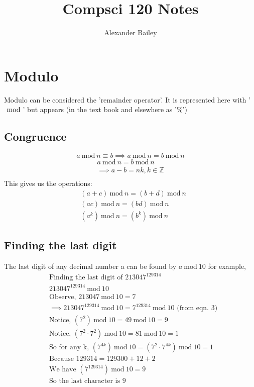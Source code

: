 \documentclass[12pt] {article}
\newcommand{\Mod}[1]{\ \mathrm{mod}\ #1}
\begin{document}
\title{Compsci 120 Notes}
\author{Alexander Bailey}
\maketitle

\section*{Modulo}
Modulo can be considered the 'remainder operator'. It is represented here with '$\Mod$'
but appears (in the text book and elsewhere as '$\%$')
\subsection*{Congruence}
\begin{equation*}
  a \Mod n \equiv b 
  \implies a \Mod n = b \Mod n
\end{equation*}
\begin{align*}
  a \Mod n = b \Mod n \\
  \implies a-b = nk, k \in \mathbb{Z} \\
\end{align*}
This gives us the operations:
\begin{align}
  &(a+c) \Mod n = (b+d) \Mod n \\
  &(ac) \Mod n = (bd) \Mod n \\
  &(a^k) \Mod n = (b^k) \Mod n 
\end{align}
\subsection*{Finding the last digit}
The last digit of any decimal number a can be found by $a \Mod 10$ for example,
\begin{align*}
  &\text{Finding the last digit of } 213047^{129314} \\
  &213047^{129314} \Mod 10 \\
  &\text{Observe, } 213047 \Mod 10 = 7 \\
  &\implies  213047^{129314} \Mod 10 = 7^{129314} \Mod 10 \text{ (from eqn. 3)} \\
  &\text{Notice, } (7^2) \Mod 10 = 49 \Mod 10 = 9 \\
  &\text{Notice, } (7^2 \cdot 7^2) \Mod 10 = 81 \Mod 10 = 1 \\
  &\text{So for any k, } (7^{4k}) \Mod 10 = (7^2 \cdot 7^{4k}) \Mod 10 = 1 \\
  &\text{Because } 129314  = 129300+12+2 \\
  &\text{We have } (7^{129314}) \Mod 10 = 9 \\
  &\text{So the last character is 9}
\end{align*}
\end{document}
